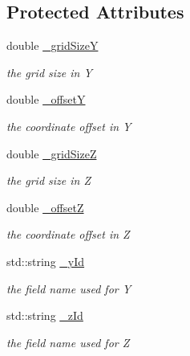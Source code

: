\subsection*{Protected Attributes}
\begin{DoxyCompactItemize}
\item 
double \hyperlink{class_d_d4hep_1_1_d_d_segmentation_1_1_cartesian_grid_y_z_ac1bd277d62423bb439394096d82a0ea4}{\+\_\+grid\+SizeY}
\begin{DoxyCompactList}\small\item\em the grid size in Y \end{DoxyCompactList}\item 
double \hyperlink{class_d_d4hep_1_1_d_d_segmentation_1_1_cartesian_grid_y_z_aeb373831f13b0bf9ca5d534b7551cf50}{\+\_\+offsetY}
\begin{DoxyCompactList}\small\item\em the coordinate offset in Y \end{DoxyCompactList}\item 
double \hyperlink{class_d_d4hep_1_1_d_d_segmentation_1_1_cartesian_grid_y_z_a4584ea29126b00ef60c8a75eeda06028}{\+\_\+grid\+SizeZ}
\begin{DoxyCompactList}\small\item\em the grid size in Z \end{DoxyCompactList}\item 
double \hyperlink{class_d_d4hep_1_1_d_d_segmentation_1_1_cartesian_grid_y_z_a4cd904d09e43a33180ef8c0951c99cc7}{\+\_\+offsetZ}
\begin{DoxyCompactList}\small\item\em the coordinate offset in Z \end{DoxyCompactList}\item 
std\+::string \hyperlink{class_d_d4hep_1_1_d_d_segmentation_1_1_cartesian_grid_y_z_ad7b9edca36f4b35162b3b49b3763e245}{\+\_\+y\+Id}
\begin{DoxyCompactList}\small\item\em the field name used for Y \end{DoxyCompactList}\item 
std\+::string \hyperlink{class_d_d4hep_1_1_d_d_segmentation_1_1_cartesian_grid_y_z_ad2f85ca98f4c77d7dcad2f949b8ea7e1}{\+\_\+z\+Id}
\begin{DoxyCompactList}\small\item\em the field name used for Z \end{DoxyCompactList}\end{DoxyCompactItemize}
